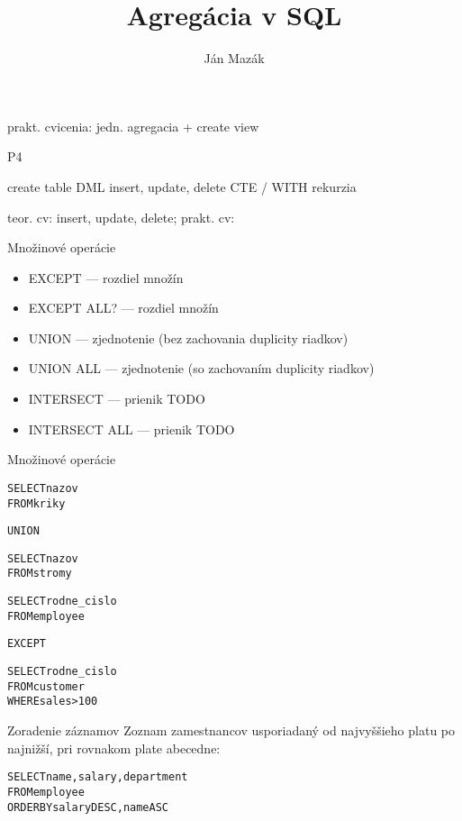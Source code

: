 \documentclass[12pt]{beamer}
\title{Agregácia v SQL}
\author{Ján Mazák}
\institute{FMFI UK Bratislava}
\date{}
\begin{document}
\frame{\titlepage}

prakt. cvicenia: jedn. agregacia + create view

P4

create table
DML insert, update, delete
CTE / WITH
rekurzia

teor. cv: insert, update, delete; 
prakt. cv: 




\begin{frame}{Množinové operácie}
\begin{itemize}
\item EXCEPT --- rozdiel množín
\item EXCEPT ALL? --- rozdiel množín
\item UNION --- zjednotenie (bez zachovania duplicity riadkov)
\item UNION ALL --- zjednotenie (so zachovaním duplicity riadkov)
\item INTERSECT --- prienik TODO
\item INTERSECT ALL --- prienik TODO
\end{itemize}
\end{frame}

\begin{frame}[fragile]{Množinové operácie}
\begin{minipage}{.4\pdfpagewidth}
\begin{alltt}
SELECT nazov
FROM kriky

\alert{UNION}

SELECT nazov
FROM stromy
\end{alltt}
\end{minipage}
\begin{minipage}{.4\pdfpagewidth}
\begin{alltt}
SELECT rodne_cislo
FROM employee

\alert{EXCEPT}

SELECT rodne_cislo
FROM customer
WHERE sales > 100
\end{alltt}
\end{minipage}
\end{frame}

\begin{frame}[fragile]{Zoradenie záznamov}
Zoznam zamestnancov usporiadaný od najvyššieho platu po najnižší, pri rovnakom plate abecedne:
\begin{alltt}
SELECT name, salary, department
FROM employee
\alert{ORDER BY} salary DESC, name ASC
\end{alltt}
\end{frame}
\end{document}

